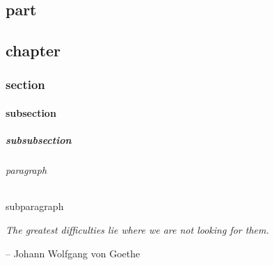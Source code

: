 \documentclass[12pt, a4paper, oneside]{report}	%
\begin{document}
\begin{enumerate}[1.]

\begin{enumerate}[1)]


\usepackage{enumitem}

\begin{enumerate}[label=\arabic*)]

\begin{enumerate}[label=\alph*)]


\setcounter{enumi}{19}

\part{part}
\chapter{chapter}
\section{section}
\subsection{subsection}
\subsubsection{subsubsection}
\paragraph{paragraph}
\subparagraph{subparagraph}

\usepackage[auto]{chappg}




\usepackage{epigraph}
\epigraph{\textit{The greatest difficulties lie where we are not looking for them.}}
{-- Johann Wolfgang von Goethe}




\end{enumerate}
\end{enumerate}
\end{enumerate}
\end{enumerate}
\end{document}
